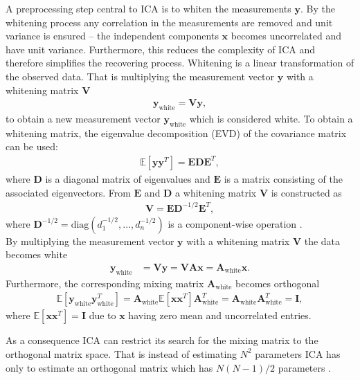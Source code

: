 A preprocessing step central to ICA is to whiten the measurements $\mathbf{y}$. 
By the whitening process any correlation in the measurements are removed and unit variance is ensured -- the independent components $\mathbf{x}$ becomes uncorrelated and have unit variance. 
Furthermore, this reduces the complexity of ICA and therefore simplifies the recovering process.
Whitening is a linear transformation of the observed data. 
That is multiplying the measurement vector $\mathbf{y}$ with a whitening matrix $\mathbf{V}$
\begin{align*}
\mathbf{y}_{\text{white}} = \mathbf{V} \mathbf{y},
\end{align*} 
to obtain a new measurement vector $\mathbf{y}_{\text{white}}$ which is considered white. 
To obtain a whitening matrix, the eigenvalue decomposition (EVD) of the covariance matrix can be used:
\begin{align*}
\mathbb{E}[\mathbf{yy}^T] = \mathbf{EDE}^T,
\end{align*}
where $\mathbf{D}$ is a diagonal matrix of eigenvalues and $\mathbf{E}$ is a matrix consisting of the associated eigenvectors. 
From $\mathbf{E}$ and $\mathbf{D}$ a whitening matrix $\mathbf{V}$ is constructed as
\begin{align*}
\mathbf{V} = \mathbf{ED}^{-1/2} \mathbf{E}^T,
\end{align*}
where $\mathbf{D}^{-1/2} = \text{diag}(d_1^{-1/2}, \dots, d_n^{-1/2})$ is a component-wise operation \cite[p. 159]{ICA}.
\\  
By multiplying the measurement vector $\mathbf{y}$ with a whitening matrix $\mathbf{V}$ the data becomes white
\begin{align*}
\mathbf{y}_{\text{white}} &= \mathbf{Vy} = \mathbf{VAx} = \mathbf{A}_{\text{white}} \mathbf{x}.
\end{align*}
Furthermore, the corresponding mixing matrix $\mathbf{A}_{\text{white}}$ becomes orthogonal 
\begin{align*}
 \mathbb{E}[\mathbf{y}_{\text{white}} \mathbf{y}_{\text{white}}^T] = \mathbf{A}_{\text{white}} \mathbb{E}[\mathbf{xx}^T] \mathbf{A}_{\text{white}}^T = \mathbf{A}_{\text{white}} \mathbf{A}_{\text{white}}^T = \mathbf{I},
 \end{align*} 
where $\mathbb{E}[\mathbf{xx}^T] = \mathbf{I}$ due to $\mathbf{x}$ having zero mean and uncorrelated entries. 

As a consequence ICA can restrict its search for the mixing matrix to the orthogonal matrix space. That is instead of estimating $N^2$ parameters ICA has only to estimate an orthogonal matrix which has $N(N-1)/2$ parameters \cite[p. 159]{ICA}.

